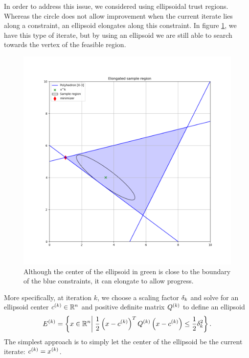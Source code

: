 \documentclass{article}
\begin{document}
In order to address this issue, we considered using ellipsoidal trust regions.
Whereas the circle does not allow improvement when the current iterate lies along a constraint, an ellipsoid elongates along this constraint.
In figure \cref{ellipse_adv}, we have this type of iterate, but by using an ellipsoid we are still able to search towards the vertex of the feasible region.
\begin{figure}[ht]
    \centering
    \includegraphics[scale=0.4]{images/long_ellipsoid.png}
    \caption[An ellipsoidal trust region allows for more progress than a circular trust region.] {
    	Although the center of the ellipsoid in green is close to the boundary of the blue constraints, it can elongate to allow progress.
    }
    \label{ellipse_adv}
\end{figure}



More specifically, at iteration $k$, we choose a scaling factor $\delta_k$ and solve for an ellipsoid center $c^{(k)} \in \mathbb R^n$ and positive definite matrix ${Q^{(k)}}$ to define an ellipsoid
\begin{align*}
{E^{(k)}} = \left\{x \in \mathbb R^n \bigg| \; \frac 1 2 \left(x - c^{(k)}\right)^T{Q^{(k)}}\left(x - c^{(k)}\right) \le \frac 1 2 \delta_k^2 \right\}.
\end{align*}
The simplest approach is to simply let the center of the ellipsoid be the current iterate: $c^{(k)} = x^{(k)}$.
\end{document}
